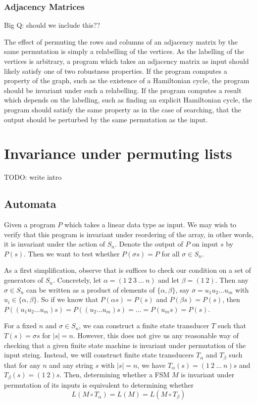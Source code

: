 \documentclass{llncs}
\begin{document}
  \subsubsection{Adjacency Matrices}

    Big Q: should we include this??

    The effect of permuting the rows and columns of an adjacency matrix by the same
    permutation is simply a relabelling of the vertices.  As the labelling of the
    vertices is arbitrary, a program which takes an adjacency matrix as input should
    likely satisfy one of two robustness properties.  If the program computes a
    property of the graph, such as the existence of a Hamiltonian cycle, the program
    should be invariant under such a relabelling.  If the program computes a result
    which depends on the labelling, such as finding an explicit Hamiltonian cycle,
    the program should satisfy the same property as in the case of searching, that
    the output should be perturbed by the same permutation as the input.


\section{Invariance under permuting lists}
\label{permlists}

  TODO: write intro

  \subsection{Automata}
    Given a program $P$ which takes a linear data type
    as input. We may wish to verify that this program
    is invariant under reordering of the array,
    in other words, it is invariant under the action of $S_n$.
    Denote the output of $P$ on input $s$ by $P(s)$.
    Then we want to test whether $P(\sigma s) = P$
    for all $\sigma \in S_n$.

    As a first simplification, observe that is
    suffices to check our condition on a set
    of generators of $S_n$.
    Concretely, let $\alpha = (1\ 2\ 3\ ...\ n)$
    and let $\beta = (1\ 2)$.
    Then any $\sigma \in S_n$ can be written as
    a product of elements of $\{\alpha,\beta\}$,
    say $\sigma = u_1 u_2\ldots u_m$ with
    $u_i \in \{\alpha,\beta\}$.
    So if we know that $P(\alpha s) = P(s)$
    and $P(\beta s) = P(s)$, then
    $P((u_1 u_2 \ldots u_m)s)
    = P((u_2 \ldots u_m)s)
    = \ldots = P(u_ms) = P(s) $.

    For a fixed $n$ and $\sigma \in S_n$,
    we can construct a finite state transducer
    $T$ such that $T(s) = \sigma s$ for $|s|=n$.
    However, this does not give us any
    reasonable way of checking that a given
    finite state machine is invariant under permutation
    of the input string.
    Instead, we will construct finite state
    transducers $T_{\alpha}$ and $T_{\beta}$
    such that for any $n$ and any string $s$
    with $|s|=n$, we have
    $T_{\alpha}(s)=(1\ 2\ \ldots\ n) s$ and
    $T_{\beta}(s) = (1\ 2) s$.
    Then, determining whether a FSM $M$ is
    invariant under permutation of its inputs
    is equivalent to determining whether
    \[
      L(M \circ T_\alpha) = L(M) = L(M \circ T_\beta)
    \]
\end{document}
